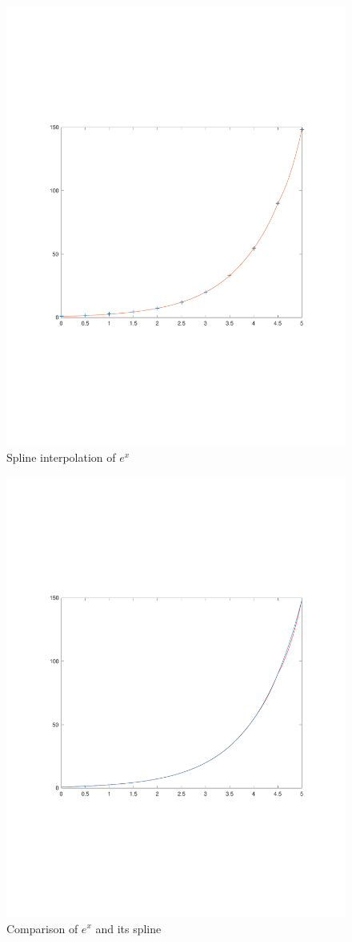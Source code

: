 \documentclass{article}
\begin{document}
\begin{figure}[h]
\centering
\caption{Spline interpolation of $e^x$}
\includegraphics[scale=0.6]{ex}
\end{figure}

\begin{figure}[h]
\centering
\caption{Comparison of $e^x$ and its spline}
\includegraphics[scale=0.6]{diff}
\end{figure}
\end{document}
